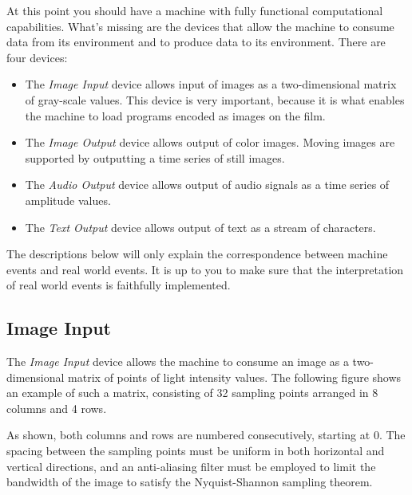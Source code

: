 \documentclass[a4paper,12pt]{article}
\begin{document}
At this point you should have a machine with fully functional computational capabilities.
What's missing are the devices that allow the machine to consume data from its environment and to produce data to its environment.
There are four devices:
\begin{itemize}
\item The \emph{Image Input} device allows input of images as a two-dimensional matrix of gray-scale values.
  This device is very important, because it is what enables the machine to load programs encoded as images on the film.
\item The \emph{Image Output} device allows output of color images.
  Moving images are supported by outputting a time series of still images.
\item The \emph{Audio Output} device allows output of audio signals as a time series of amplitude values.
\item The \emph{Text Output} device allows output of text as a stream of characters.
\end{itemize}
The descriptions below will only explain the correspondence between machine events and real world events.
It is up to you to make sure that the interpretation of real world events is faithfully implemented.

\subsection{Image Input}

The \emph{Image Input} device allows the machine to consume an image as a two-dimensional matrix of points of light intensity values.
The following figure shows an example of such a matrix, consisting of 32 sampling points arranged in 8 columns and 4 rows.
\begin{center}
\end{center}
As shown, both columns and rows are numbered consecutively, starting at 0.
The spacing between the sampling points must be uniform in both horizontal and vertical directions, and an anti-aliasing filter must be employed to limit the bandwidth of the image to satisfy the Nyquist-Shannon sampling theorem.
\end{document}
